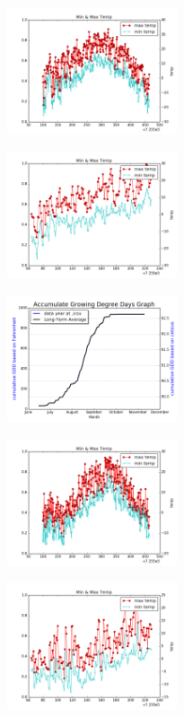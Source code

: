 \documentclass[DIV=calc, paper=a4, fontsize=11pt, twocolumn]{scrartcl}
\begin{document}
\begin{figure}[h!]
	\centering
	\includegraphics[width=50mm]{../output/27211_2015_minmax.png}

	\label{fig:method8}
\end{figure}
\begin{figure}[h!]
	\centering
	\includegraphics[width=50mm]{../output/27211_2016_minmax.png}

	\label{fig:method9}
\end{figure}
\begin{figure}[h!]
	\centering
	\includegraphics[width=50mm]{../output/50089_2015_gdd.png}

	\label{fig:method10}
\end{figure}
\begin{figure}[h!]
	\centering
	\includegraphics[width=50mm]{../output/50089_2015_minmax.png}

	\label{fig:method11}
\end{figure}
\begin{figure}[h!]
	\centering
	\includegraphics[width=50mm]{../output/50089_2016_minmax.png}

	\label{fig:method12}
\end{figure}
\end{document}
